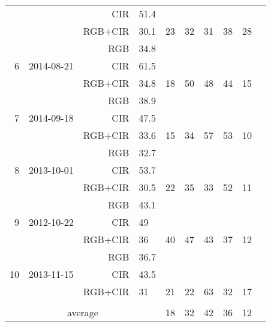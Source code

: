 \documentclass[remotesensing,article,submit,moreauthors,pdftex,12pt,a4paper]{mdpi} %
\begin{document}
\begin{table}
{\begin{tabular}{rrr|lrrrrrr}
       &       & CIR   & 51.4  &       &       &       &       &  \\
      &       & RGB+CIR & 30.1  & 23    & 32    & 31    & 38    & 28 \\
		 \hline
    \multirow{3}{*}{6}    & \multirow{3}{*}{2014-08-21} & RGB   & 34.8  &       &       &       &       &  \\
        &       & CIR   & 61.5  &       &       &       &       &  \\
     &       & RGB+CIR & 34.8    & 18    & 50    & 48    & 44    & 15 \\
		 \hline
    \multirow{3}{*}{7}    & \multirow{3}{*}{2014-09-18} & RGB   &   38.9    &       &       &       &       &  \\
       &       & CIR   &   47.5    &       &       &       &       &  \\
     &       & RGB+CIR &   33.6    &  15     &  34     &   57    &   53    & 10 \\
		 \hline
    \multirow{3}{*}{8}    & \multirow{3}{*}{2013-10-01} & RGB   & 32.7    &       &       &       &       &  \\
        &       & CIR   & 53.7  &       &       &       &       &  \\
     &       & RGB+CIR & 30.5  & 22    & 35    & 33    & 52    & 11 \\
		 \hline
    \multirow{3}{*}{9}    & \multirow{3}{*}{2012-10-22} & RGB   & 43.1    &       &       &       &       &  \\
        &       & CIR   & 49  &       &       &       &       &  \\
     &       & RGB+CIR & 36  & 40    & 47    & 43    & 37    & 12 \\
		 \hline
    \multirow{3}{*}{10}    & \multirow{3}{*}{2013-11-15} & RGB   & 36.7    &       &       &       &       &  \\
        &       & CIR   & 43.5  &       &       &       &       &  \\
     &       & RGB+CIR & 31  & 21    & 22    & 63    & 32    & 17 \\
    \hline
		\\
		\multicolumn{4}{c}{average} & 18 & 32	&	42 &	36 &	 12\\
		\hline
    \end{tabular}}
  \label{tab:OOB_TS}
\end{table}
\end{document}
